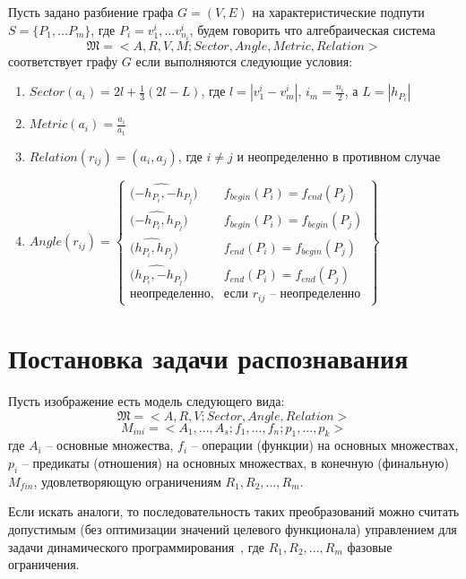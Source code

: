 \begin{definition}
Пусть задано разбиение графа $G=(V,E)$ на характеристические подпути $S=\{P_1, \dots P_m\}$, где $P_i=v^i_1, \dots v^i_{n_i}$, будем говорить что алгебраическая система
$$\mathfrak{M} = < A, R, V, M; Sector, Angle, Metric, Relation >$$
соответствует графу $G$ если выполняются следующие условия:
\begin{enumerate}
\item $Sector(a_i) = 2l + \frac{1}{3}(2l - L)$, где $l=|v^i_1-v^i_m|$, $i_m = \frac{n_i}{2}$,  а $L=|h_{P_i}|$
\item $Metric(a_i) = \frac{a_i}{a_1}$
\item $Relation(r_{ij}) = (a_i, a_j)$, где $i\neq j$ и неопределенно в противном случае
\item $Angle(r_{ij})=
	\left\{		
	\begin{array}{ll}
	\hat{(-h_{P_i}, -h_{P_j}}) & f_{begin}(P_i) = f_{end}(P_j) \\
	\hat{(-h_{P_i}, h_{P_j}}) & f_{begin}(P_i) = f_{begin}(P_j) \\
	\hat{(h_{P_i}, h_{P_j}}) & f_{end}(P_i) = f_{begin}(P_j) \\
	\hat{(h_{P_i}, -h_{P_j}}) & f_{end}(P_i) = f_{end}(P_j) \\	
	\text{неопределенно}, & \text{если } r_{ij} \text{ -- неопределенно}
	\end{array}
	\right\}	$	
\end{enumerate}
\end{definition}

\section{Постановка задачи распознавания }
Пусть изображение есть модель следующего вида:
\begin{equation}
\mathfrak{M} = < A, R, V; Sector, Angle, Relation >
\label{vipeq1}
\end{equation}
\begin{equation}
M_{ini} = <A_1,...,A_s;f_1,...,f_n;p_1,...,p_k>
\label{vipeq2}
\end{equation}
где $A_i$ -- основные множества, $f_i$ -- операции (функции) на основных множествах, $p_i$ -- предикаты (отношения) на основных множествах, в конечную (финальную) $M_{fin}$, удовлетворяющую ограничениям $R_1,R_2,...,R_m$.

Если искать аналоги, то последовательность таких преобразований можно считать допустимым (без оптимизации значений целевого функционала) управлением для задачи динамического программирования~\cite{D1}, где $R_1,R_2,...,R_m$ фазовые ограничения.

